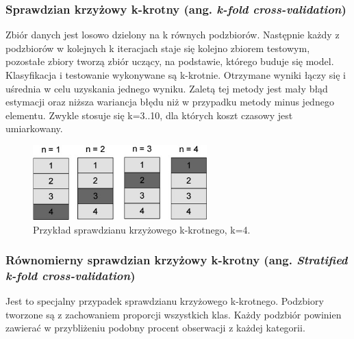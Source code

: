 \subsubsection{Sprawdzian krzyżowy k-krotny (ang. \textit{k-fold cross-validation})}
Zbiór danych jest losowo dzielony na k równych podzbiorów. Następnie każdy z podzbiorów w kolejnych k iteracjach staje się kolejno zbiorem testowym, pozostałe zbiory tworzą zbiór uczący, na podstawie, którego buduje się model. Klasyfikacja i testowanie wykonywane są k-krotnie. Otrzymane wyniki łączy się i uśrednia w celu uzyskania jednego wyniku. Zaletą tej metody jest mały błąd estymacji oraz niższa wariancja błędu niż w przypadku metody minus jednego elementu. Zwykle stosuje się k=3..10, dla których koszt czasowy jest umiarkowany.
\begin{figure}[h]
	\centering
	\includegraphics[width=0.6\textwidth]{./images/crossvalidation.jpg}
	\caption{Przykład sprawdzianu krzyżowego k-krotnego, k=4.}
	\label{fig:sprawdziankrzyzowy}
\end{figure}

\subsubsection{Równomierny sprawdzian krzyżowy k-krotny (ang. \textit{Stratified k-fold cross-validation})}
Jest to specjalny przypadek sprawdzianu krzyżowego k-krotnego. Podzbiory tworzone są z zachowaniem proporcji wszystkich klas. Każdy podzbiór powinien zawierać w przybliżeniu podobny procent obserwacji z każdej kategorii.









